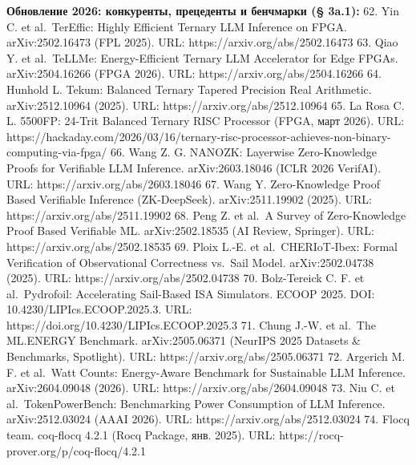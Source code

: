 \documentclass[
  russian,
]{article}
\begin{document}
\textbf{Обновление 2026: конкуренты, прецеденты и бенчмарки (§ 3a.1):}
62. Yin C. et al.~TerEffic: Highly Efficient Ternary LLM Inference on
FPGA. arXiv:2502.16473 (FPL 2025). URL: https://arxiv.org/abs/2502.16473
63. Qiao Y. et al.~TeLLMe: Energy-Efficient Ternary LLM Accelerator for
Edge FPGAs. arXiv:2504.16266 (FPGA 2026). URL:
https://arxiv.org/abs/2504.16266 64. Hunhold L. Tekum: Balanced Ternary
Tapered Precision Real Arithmetic. arXiv:2512.10964 (2025). URL:
https://arxiv.org/abs/2512.10964 65. La Rosa C. L. 5500FP: 24-Trit
Balanced Ternary RISC Processor (FPGA, март 2026). URL:
https://hackaday.com/2026/03/16/ternary-risc-processor-achieves-non-binary-computing-via-fpga/
66. Wang Z. G. NANOZK: Layerwise Zero-Knowledge Proofs for Verifiable
LLM Inference. arXiv:2603.18046 (ICLR 2026 VerifAI). URL:
https://arxiv.org/abs/2603.18046 67. Wang Y. Zero-Knowledge Proof Based
Verifiable Inference (ZK-DeepSeek). arXiv:2511.19902 (2025). URL:
https://arxiv.org/abs/2511.19902 68. Peng Z. et al.~A Survey of
Zero-Knowledge Proof Based Verifiable ML. arXiv:2502.18535 (AI Review,
Springer). URL: https://arxiv.org/abs/2502.18535 69. Ploix L.-E. et
al.~CHERIoT-Ibex: Formal Verification of Observational Correctness
vs.~Sail Model. arXiv:2502.04738 (2025). URL:
https://arxiv.org/abs/2502.04738 70. Bolz-Tereick C. F. et
al.~Pydrofoil: Accelerating Sail-Based ISA Simulators. ECOOP 2025. DOI:
10.4230/LIPIcs.ECOOP.2025.3. URL:
https://doi.org/10.4230/LIPIcs.ECOOP.2025.3 71. Chung J.-W. et al.~The
ML.ENERGY Benchmark. arXiv:2505.06371 (NeurIPS 2025 Datasets \&
Benchmarks, Spotlight). URL: https://arxiv.org/abs/2505.06371 72.
Argerich M. F. et al.~Watt Counts: Energy-Aware Benchmark for
Sustainable LLM Inference. arXiv:2604.09048 (2026). URL:
https://arxiv.org/abs/2604.09048 73. Niu C. et al.~TokenPowerBench:
Benchmarking Power Consumption of LLM Inference. arXiv:2512.03024 (AAAI
2026). URL: https://arxiv.org/abs/2512.03024 74. Flocq team. coq-flocq
4.2.1 (Rocq Package, янв. 2025). URL:
https://rocq-prover.org/p/coq-flocq/4.2.1
\end{document}
